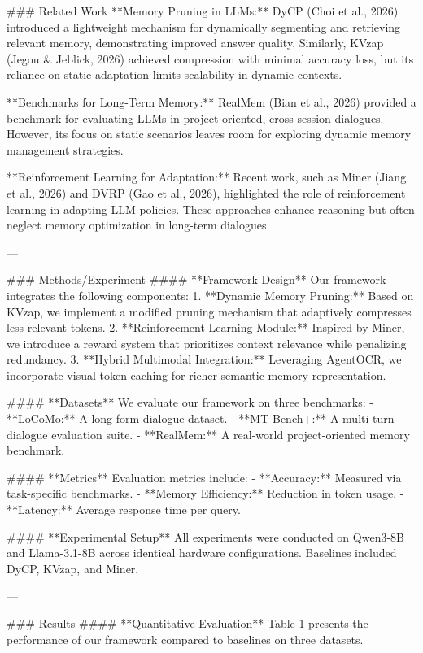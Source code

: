 ### Related Work  
**Memory Pruning in LLMs:**  
DyCP (Choi et al., 2026) introduced a lightweight mechanism for dynamically segmenting and retrieving relevant memory, demonstrating improved answer quality. Similarly, KVzap (Jegou & Jeblick, 2026) achieved compression with minimal accuracy loss, but its reliance on static adaptation limits scalability in dynamic contexts.

**Benchmarks for Long-Term Memory:**  
RealMem (Bian et al., 2026) provided a benchmark for evaluating LLMs in project-oriented, cross-session dialogues. However, its focus on static scenarios leaves room for exploring dynamic memory management strategies.

**Reinforcement Learning for Adaptation:**  
Recent work, such as Miner (Jiang et al., 2026) and DVRP (Gao et al., 2026), highlighted the role of reinforcement learning in adapting LLM policies. These approaches enhance reasoning but often neglect memory optimization in long-term dialogues.

---

### Methods/Experiment  
#### **Framework Design**  
Our framework integrates the following components:  
1. **Dynamic Memory Pruning:** Based on KVzap, we implement a modified pruning mechanism that adaptively compresses less-relevant tokens.  
2. **Reinforcement Learning Module:** Inspired by Miner, we introduce a reward system that prioritizes context relevance while penalizing redundancy.  
3. **Hybrid Multimodal Integration:** Leveraging AgentOCR, we incorporate visual token caching for richer semantic memory representation.

#### **Datasets**  
We evaluate our framework on three benchmarks:  
- **LoCoMo:** A long-form dialogue dataset.  
- **MT-Bench+:** A multi-turn dialogue evaluation suite.  
- **RealMem:** A real-world project-oriented memory benchmark.

#### **Metrics**  
Evaluation metrics include:  
- **Accuracy:** Measured via task-specific benchmarks.  
- **Memory Efficiency:** Reduction in token usage.  
- **Latency:** Average response time per query.

#### **Experimental Setup**  
All experiments were conducted on Qwen3-8B and Llama-3.1-8B across identical hardware configurations. Baselines included DyCP, KVzap, and Miner.

---

### Results  
#### **Quantitative Evaluation**  
Table 1 presents the performance of our framework compared to baselines on three datasets.  


